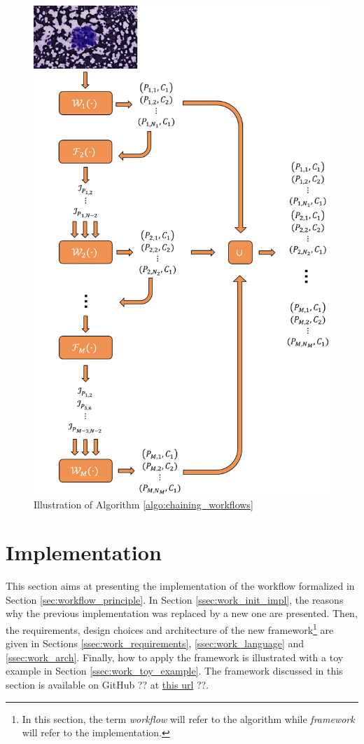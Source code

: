 \begin{figure}
	\center
	\includegraphics[scale=0.75]{image/chaining_illustration.png}
	\caption{Illustration of Algorithm \ref{algo:chaining_workflows}}
	\label{fig:chaining_illustration}
\end{figure}
\section{Implementation}
\label{sec:workflow_impl}
This section aims at presenting the implementation of the workflow formalized in Section \ref{sec:workflow_principle}. In Section \ref{ssec:work_init_impl}, the reasons why the previous implementation was replaced by a new one are presented. Then, the requirements, design choices and architecture of the new framework\footnote{In this section, the term \textit{workflow} will refer to the algorithm while \textit{framework} will refer to the implementation.} are given in Sections \ref{ssec:work_requirements}, \ref{ssec:work_language} and \ref{ssec:work_arch}. Finally, how to apply the framework is illustrated with a toy example in Section \ref{ssec:work_toy_example}. The framework discussed in this section is available on GitHub ?? at \href{https://github.com/waliens/sldc}{this url} ??.

